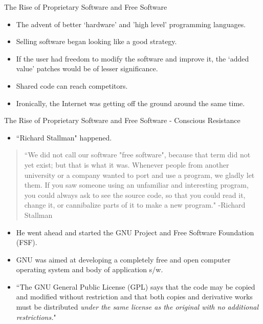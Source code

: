 \documentclass{beamer}
\begin{document}
\begin{frame}{The Rise of Proprietary Software and Free Software}
\begin{itemize}
	\item The advent of better `hardware' and 'high level' programming languages. 
	\item Selling software began looking like a good strategy. 
	\item If the user had freedom to modify the software and improve it, the `added value' patches would be of lesser significance. 
	\item Shared code can reach competitors. 
	\item Ironically, the Internet was getting off the ground around the same time.
\end{itemize}
\end{frame}

\begin{frame}{The Rise of Proprietary Software and Free Software - Conscious Resistance}
\begin{itemize}
	\item ``Richard Stallman" happened.
\end{itemize}
\begin{quote}
		\tiny{``We did not call our software "free software", because that term did not yet exist; but that is what it was. Whenever people from another university or a company wanted to port and use a program, we gladly let them. If you saw someone using an unfamiliar and interesting program, you could always ask to see the source code, so that you could read it, change it, or cannibalize parts of it to make a new program." -Richard Stallman}
\end{quote} 	
\begin{itemize}
	\item He went ahead and started the GNU Project and Free Software Foundation (FSF). 
	\item GNU was aimed at developing a completely free and open computer operating system and body of application s/w. 
	\item \small{``The GNU General Public License (GPL) says that the code may be copied and modified without restriction and that both copies and derivative works must be distributed \emph{under the same license as the original with no additional restrictions.}"}
\end{itemize}
\end{frame}
\end{document}

